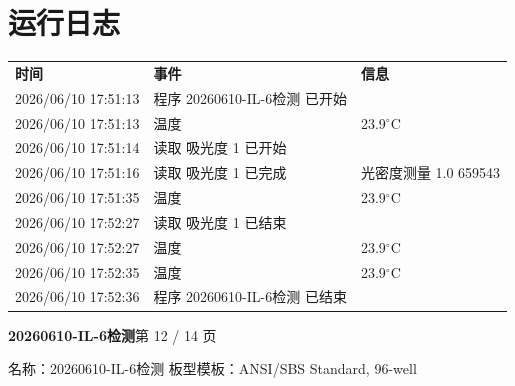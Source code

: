 \documentclass[UTF8,10pt,a4paper,fontset=fandol]{ctexart}
\begin{document}
\section*{运行日志}

\begin{tabular}{@{}p{3.7cm}p{6.1cm}p{4.0cm}@{}}
\textbf{时间} & \textbf{事件} & \textbf{信息}\\
2026/06/10 17:51:13 & 程序 20260610-IL-6检测 已开始 & \\
2026/06/10 17:51:13 & 温度 & 23.9$^\circ$C\\
2026/06/10 17:51:14 & 读取 吸光度 1 已开始 & \\
2026/06/10 17:51:16 & 读取 吸光度 1 已完成 & 光密度测量 1.0 659543\\
2026/06/10 17:51:35 & 温度 & 23.9$^\circ$C\\
2026/06/10 17:52:27 & 读取 吸光度 1 已结束 & \\
2026/06/10 17:52:27 & 温度 & 23.9$^\circ$C\\
2026/06/10 17:52:35 & 温度 & 23.9$^\circ$C\\
2026/06/10 17:52:36 & 程序 20260610-IL-6检测 已结束 & \\
\end{tabular}

\newpage

\begin{center}
\textbf{20260610-IL-6检测}\hfill 第 12 / 14 页
\end{center}

名称：20260610-IL-6检测\qquad
板型模板：ANSI/SBS Standard, 96-well
\end{document}
